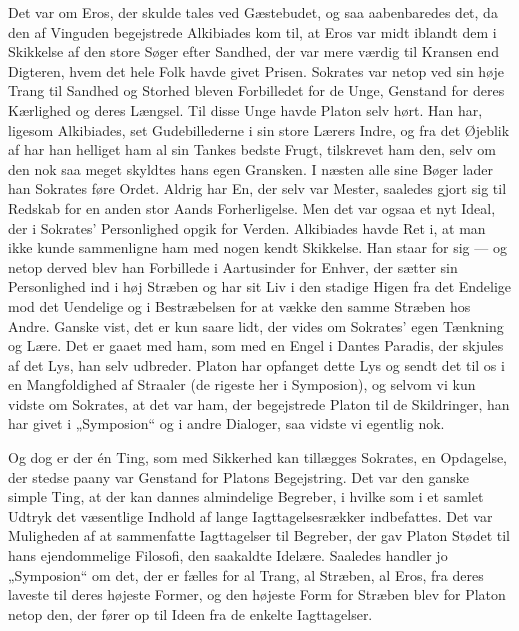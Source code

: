 \documentclass[12pt,a4paper,openany]{book}
\newcommand{\opage}[1]{\marginnote{\footnotesize\textit{[#1]}}}
\newcommand{\whiteline}{\par\vspace{\baselineskip}\par}
\begin{document}
\whiteline

Det var om Eros, der skulde tales ved Gæstebudet, og saa
aabenbaredes det, da den af Vinguden begejstrede Alkibiades
kom til, at Eros var midt iblandt dem i Skikkelse af den store
Søger efter Sandhed, der var mere værdig til Kransen end Digteren,
hvem det hele Folk havde givet Prisen. Sokrates var netop
ved sin høje Trang til Sandhed og Storhed bleven Forbilledet
for de Unge, Genstand for deres Kærlighed og deres Længsel.
Til disse Unge havde Platon selv hørt. Han har, ligesom Alkibiades,
set Gudebillederne i sin store Lærers Indre, og fra det
Øjeblik af har han helliget ham al sin Tankes bedste Frugt, tilskrevet
ham den, selv om den nok saa meget skyldtes hans
egen Gransken. I næsten alle sine Bøger lader han Sokrates
føre Ordet. Aldrig har En, der selv var Mester, saaledes gjort
sig til Redskab for en anden stor Aands Forherligelse. Men det
var ogsaa et nyt Ideal, der i Sokrates’ Personlighed opgik for
\setcounter{footnote}{0}%
\opage{89}Verden. Alkibiades havde Ret i, at man ikke kunde sammenligne
ham med nogen kendt Skikkelse. Han staar for sig --- og
netop derved blev han Forbillede i Aartusinder for Enhver, der
sætter sin Personlighed ind i høj Stræben og har sit Liv i den
stadige Higen fra det Endelige mod det Uendelige og i Bestræbelsen
for at vække den samme Stræben hos Andre. Ganske vist,
det er kun saare lidt, der vides om Sokrates’ egen Tænkning
og Lære. Det er gaaet med ham, som med en Engel i Dantes
Paradis, der skjules af det Lys, han selv udbreder. Platon har
opfanget dette Lys og sendt det til os i en Mangfoldighed af
Straaler (de rigeste her i Symposion), og selvom vi kun vidste
om Sokrates, at det var ham, der begejstrede Platon til de Skildringer,
han har givet i „Symposion“ og i andre Dialoger, saa
vidste vi egentlig nok.

Og dog er der én Ting, som med Sikkerhed kan tillægges
Sokrates, en Opdagelse, der stedse paany var Genstand for
Platons Begejstring. Det var den ganske simple Ting, at der
kan dannes almindelige Begreber, i hvilke som i et samlet Udtryk
det væsentlige Indhold af lange Iagttagelsesrækker indbefattes.
Det var Muligheden af at sammenfatte Iagttagelser til
Begreber, der gav Platon Stødet til hans ejendommelige Filosofi,
den saakaldte Idelære. Saaledes handler jo „Symposion“ om
det, der er fælles for al Trang, al Stræben, al Eros, fra deres
laveste til deres højeste Former, og den højeste Form for Stræben
blev for Platon netop den, der fører op til Ideen fra de enkelte
Iagttagelser.
\end{document}
